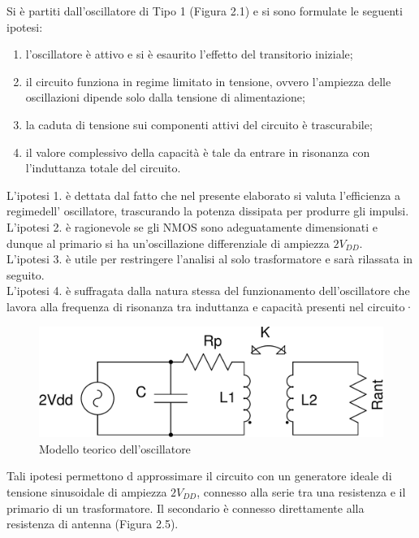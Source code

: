\documentclass[a4paper, 12pt]{memoir}
\begin{document}
Si è partiti dall'oscillatore di Tipo 1 (Figura 2.1) e si sono formulate le
seguenti ipotesi:
\begin{enumerate}
\item l'oscillatore è attivo e si è esaurito l'effetto del transitorio
	iniziale;
\item il circuito funziona in regime limitato in tensione, ovvero l'ampiezza
	delle oscillazioni dipende solo dalla tensione di alimentazione;
\item la caduta di tensione sui componenti attivi del circuito è trascurabile;
\item il valore complessivo della capacità è tale da entrare in risonanza con
	l'induttanza totale del circuito.
\end{enumerate}
L'ipotesi 1. è dettata dal fatto che nel presente elaborato si valuta 
l'efficienza a regimedell' oscillatore, trascurando la potenza dissipata per
produrre gli impulsi.\\
L'ipotesi 2. è ragionevole se gli NMOS sono adeguatamente dimensionati e dunque
al primario si ha un'oscillazione differenziale di ampiezza $2V_{DD}$.\\
L'ipotesi 3. è utile per restringere l'analisi al solo trasformatore e sarà
rilassata in seguito.\\
L'ipotesi 4. è suffragata dalla natura stessa del funzionamento 
dell'oscillatore che lavora alla frequenza di risonanza tra induttanza e
capacità presenti nel circuito·
\begin{figure}[h!]
\centering
\includegraphics[height=0.12\textheight]{images/cir_model.pdf}
\caption{Modello teorico dell'oscillatore}
\end{figure}

Tali ipotesi permettono d approssimare il circuito con un generatore
ideale di tensione sinusoidale di ampiezza $2V_{DD}$, connesso alla serie tra
una resistenza e il primario di un trasformatore. Il secondario è connesso
direttamente alla resistenza di antenna (Figura 2.5).
\end{document}
